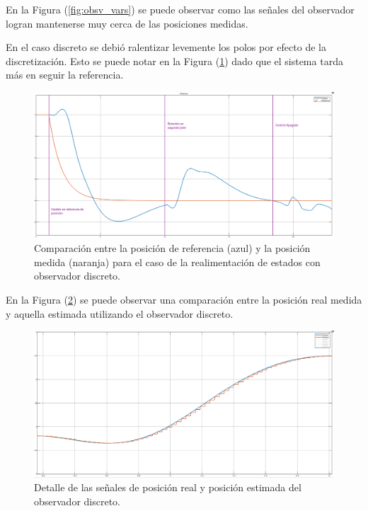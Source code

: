 En la Figura (\ref{fig:obsv_vars}) se puede observar como las señales del observador logran mantenerse muy cerca de las posiciones medidas.


En el caso discreto se debió ralentizar levemente los polos por efecto de la discretización. Esto se puede notar en la Figura (\ref{fig:obsv_disc_posref}) dado que el sistema tarda más en seguir la referencia.

\begin{figure}[H]
	\centering
	\includegraphics[width=\linewidth]{../Analisis de Resultados/ImagenesAnalisis de Resultados/obsv_disc_posref.png}
	\caption{Comparación entre la posición de referencia (azul) y la posición medida (naranja) para el caso de la realimentación de estados con observador discreto.}	
	\label{fig:obsv_disc_posref}
\end{figure}

En la Figura (\ref{fig:obsv_disc_posdisc}) se puede observar una comparación entre la posición real medida y aquella estimada utilizando el observador discreto. 

\begin{figure}[H]
	\centering
	\includegraphics[width=\linewidth]{../Analisis de Resultados/ImagenesAnalisis de Resultados/obsv_disc_posdisc.png}
	\caption{Detalle de las señales de posición real y posición estimada del observador discreto.}	
	\label{fig:obsv_disc_posdisc}
\end{figure}

